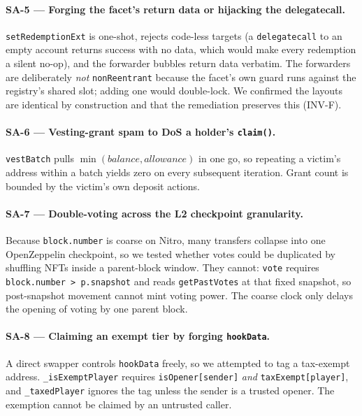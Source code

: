 \documentclass[10pt,a4paper]{article}
\newcommand{\code}[1]{\texttt{\small #1}}
\begin{document}
\paragraph{SA-5 --- Forging the facet's return data or hijacking the delegatecall.}
\code{setRedemptionExt} is one-shot, rejects code-less targets (a \code{delegatecall} to an
empty account returns success with no data, which would make every redemption a silent
no-op), and the forwarder bubbles return data verbatim. The forwarders are deliberately
\emph{not} \code{nonReentrant} because the facet's own guard runs against the registry's
shared slot; adding one would double-lock. We confirmed the layouts are identical by
construction and that the remediation preserves this (INV-F).

\paragraph{SA-6 --- Vesting-grant spam to DoS a holder's \code{claim()}.}
\code{vestBatch} pulls $\min(\textit{balance}, \textit{allowance})$ in one go, so repeating
a victim's address within a batch yields zero on every subsequent iteration. Grant count is
bounded by the victim's own deposit actions.

\paragraph{SA-7 --- Double-voting across the L2 checkpoint granularity.} Because
\code{block.number} is coarse on Nitro, many transfers collapse into one OpenZeppelin
checkpoint, so we tested whether votes could be duplicated by shuffling NFTs inside a
parent-block window. They cannot: \code{vote} requires
\code{block.number > p.snapshot} and reads \code{getPastVotes} at that fixed snapshot, so
post-snapshot movement cannot mint voting power. The coarse clock only delays the opening
of voting by one parent block.

\paragraph{SA-8 --- Claiming an exempt tier by forging \code{hookData}.} A direct swapper
controls \code{hookData} freely, so we attempted to tag a tax-exempt address.
\code{\_isExemptPlayer} requires \code{isOpener[sender]} \emph{and}
\code{taxExempt[player]}, and \code{\_taxedPlayer} ignores the tag unless the sender is a
trusted opener. The exemption cannot be claimed by an untrusted caller.
\end{document}
